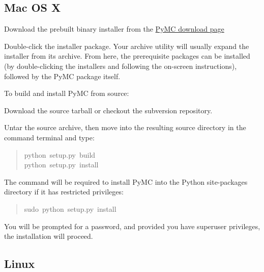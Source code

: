 \subsection*{Mac OS X}
\label{mac-os-x}
\setcounter{listcnt0}{0}
\begin{list}{.}
{
\setlength{\rightmargin}{\leftmargin}
}
\item {} 
Download the prebuilt binary installer from the \href{http://code.google.com/p/pymc/downloads/list}{PyMC download page}

\item {} 
Double-click the installer package. Your archive utility will usually expand
the installer from its archive. From here, the prerequisite packages can be
installed (by double-clicking the installers and following the on-screen
instructions), followed by the PyMC package itself.

\end{list}

To build and install PyMC from source:
\setcounter{listcnt0}{0}
\begin{list}{.}
{
\setlength{\rightmargin}{\leftmargin}
}
\item {} 
Download the source tarball or checkout the subversion repository.

\item {} 
Untar the source archive, then move into the resulting source directory in
the command terminal and type:
\begin{quote}{\ttfamily \raggedright \noindent
python~setup.py~build~\\
python~setup.py~install
}\end{quote}

\end{list}

The  command will be required to install PyMC into the Python site-packages
directory if it has restricted privileges:
\begin{quote}{\ttfamily \raggedright \noindent
sudo~python~setup.py~install
}\end{quote}

You will be prompted for a  password, and provided you have superuser privileges,
the installation will proceed.



\hypertarget{linux}{}
\subsection*{Linux}
\label{linux}

